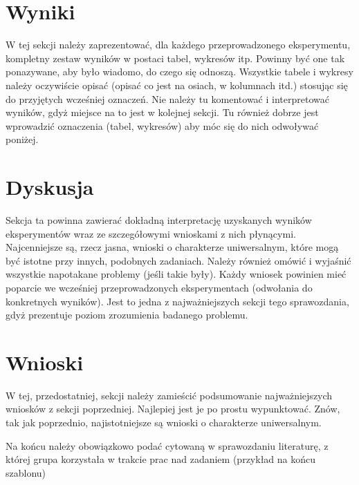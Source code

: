 \documentclass{classrep}
\begin{document}
\section{Wyniki}
{\color{blue}
W tej sekcji należy zaprezentować, dla każdego przeprowadzonego eksperymentu,
kompletny zestaw wyników w postaci tabel, wykresów itp. Powinny być one tak
ponazywane, aby było wiadomo, do czego się odnoszą. Wszystkie tabele i wykresy
należy oczywiście opisać (opisać co jest na osiach, w kolumnach itd.) stosując
się do przyjętych wcześniej oznaczeń. Nie należy tu komentować i interpretować
wyników, gdyż miejsce na to jest w kolejnej sekcji. Tu również dobrze jest
wprowadzić oznaczenia (tabel, wykresów) aby móc się do nich odwoływać
poniżej.}

\section{Dyskusja}
{\color{blue}
Sekcja ta powinna zawierać dokładną interpretację uzyskanych wyników
eksperymentów wraz ze szczegółowymi wnioskami z nich płynącymi. Najcenniejsze
są, rzecz jasna, wnioski o charakterze uniwersalnym, które mogą być istotne
przy innych, podobnych zadaniach. Należy również omówić i wyjaśnić wszystkie
napotakane problemy (jeśli takie były). Każdy wniosek powinien mieć poparcie
we wcześniej przeprowadzonych eksperymentach (odwołania do konkretnych
wyników). Jest to jedna z najważniejszych sekcji tego sprawozdania, gdyż
prezentuje poziom zrozumienia badanego problemu.}
\section{Wnioski}
{\color{blue}W tej, przedostatniej, sekcji należy zamieścić podsumowanie
najważniejszych wniosków z sekcji poprzedniej. Najlepiej jest je po prostu
wypunktować. Znów, tak jak poprzednio, najistotniejsze są wnioski o
charakterze uniwersalnym.}


\begin{thebibliography}{0}
\end{thebibliography}
{\color{blue} 
Na końcu należy obowiązkowo podać cytowaną w sprawozdaniu
literaturę, z której grupa korzystała w trakcie prac nad zadaniem (przykład na
końcu szablonu)}
\end{document}
